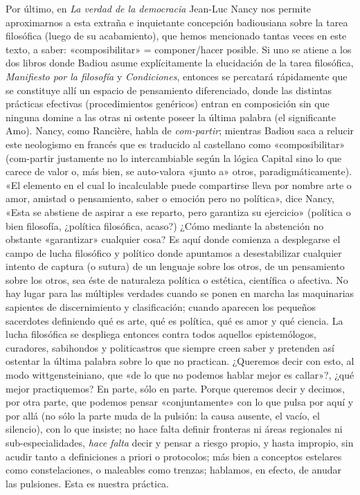 Por último, en \emph{La verdad de la democracia} Jean-Luc Nancy nos permite aproximarnos a esta extraña e inquietante concepción badiousiana sobre la tarea filosófica (luego de su acabamiento), que hemos mencionado tantas veces en este texto, a saber: «composibilitar» = componer/hacer posible. Si uno se atiene a los dos libros donde Badiou asume explícitamente la elucidación de la tarea filosófica, \emph{Manifiesto por la filosofía} y \emph{Condiciones}, entonces se percatará rápidamente que se constituye allí un espacio de pensamiento diferenciado, donde las distintas prácticas efectivas (procedimientos genéricos) entran en composición sin que ninguna domine a las otras ni ostente poseer la última palabra (el significante Amo). Nancy, como Rancière, habla de \emph{com-partir}; mientras Badiou saca a relucir este neologismo en francés que es traducido al castellano como «composibilitar» (com-partir justamente no lo intercambiable según la lógica Capital sino lo que carece de valor o, más bien, se auto-valora «junto a» otros, paradigmáticamente). «El elemento en el cual lo incalculable puede compartirse lleva por nombre arte o amor, amistad o pensamiento, saber o emoción pero no política», dice Nancy, «Esta se abstiene de aspirar a ese reparto, pero garantiza su ejercicio» (política o bien filosofía, ¿política filosófica, acaso?) ¿Cómo mediante la abstención no obstante «garantizar» cualquier cosa? Es aquí donde comienza a desplegarse el campo de lucha filosófico y político donde apuntamos a desestabilizar cualquier intento de captura (o sutura) de un lenguaje sobre los otros, de un pensamiento sobre los otros, sea éste de naturaleza política o estética, científica o afectiva. No hay lugar para las múltiples verdades cuando se ponen en marcha las maquinarias sapientes de discernimiento y clasificación; cuando aparecen los pequeños sacerdotes definiendo qué es arte, qué es política, qué es amor y qué ciencia. La lucha filosófica se despliega entonces contra todos aquellos epistemólogos, curadores, sabihondos y politicastros que siempre creen saber y pretenden así ostentar la última palabra sobre lo que no practican. ¿Queremos decir con esto, al modo wittgensteiniano, que «de lo que no podemos hablar mejor es callar»?, ¿qué mejor practiquemos? En parte, sólo en parte. Porque queremos decir y decimos, por otra parte, que podemos pensar «conjuntamente» con lo que pulsa por aquí y por allá (no sólo la parte muda de la pulsión: la causa ausente, el vacío, el silencio), con lo que insiste; no hace falta definir fronteras ni áreas regionales ni sub-especialidades, \emph{hace falta} decir y pensar a riesgo propio, y hasta impropio, sin acudir tanto a definiciones a priori o protocolos; más bien a conceptos estelares como constelaciones, o maleables como trenzas; hablamos, en efecto, de anudar las pulsiones. Esta es nuestra práctica.

